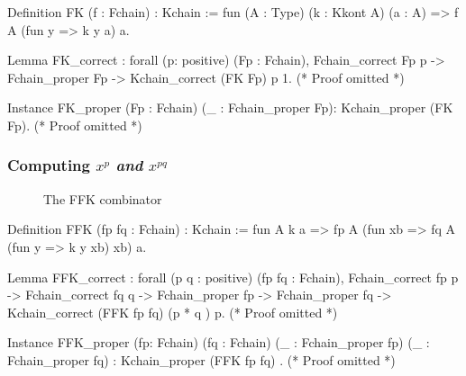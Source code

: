 \begin{Coqsrc}
  
Definition FK (f : Fchain) : Kchain :=
  fun (A : Type) (k : Kkont A) (a : A) =>
    f A (fun y => k y a) a.

Lemma FK_correct : forall (p: positive) (Fp : Fchain),
                     Fchain_correct  Fp p ->
                     Fchain_proper Fp ->
                     Kchain_correct (FK Fp) p 1.
(* Proof omitted *)

Instance  FK_proper  (Fp : Fchain) (_ : Fchain_proper Fp):
  Kchain_proper (FK Fp).
(* Proof omitted *)
\end{Coqsrc}

\subsubsection{Computing $x^p$ \emph{and} $x^{pq}$}


\begin{figure}[h]
  \centering
  \caption{The FFK combinator}
  \label{fig:FFK}
\end{figure}

\begin{Coqsrc}
Definition FFK (fp fq : Fchain) : Kchain :=
  fun A k a =>  fp A (fun xb  => fq A (fun y => k y xb) xb) a. 


Lemma FFK_correct :
  forall (p q  : positive) (fp fq : Fchain),
    Fchain_correct fp p  ->
    Fchain_correct fq q ->
    Fchain_proper fp ->
    Fchain_proper fq -> Kchain_correct (FFK fp fq) (p * q ) p.
(* Proof omitted *)

Instance FFK_proper 
   (fp: Fchain) (fq : Fchain)
    (_ :   Fchain_proper fp)
    (_ :  Fchain_proper fq) :  Kchain_proper (FFK fp fq) .
(* Proof omitted *)
\end{Coqsrc}


